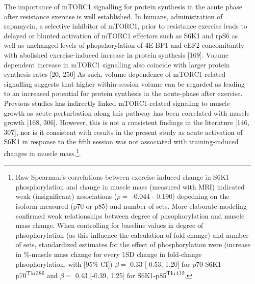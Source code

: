 \documentclass[twoside,10pt]{gihclass} %
\begin{document}
The importance of mTORC1 signalling for protein synthesis in the acute phase after resistance exercise is well established.
In humans, administration of rapamycin, a selective inhibitor of mTORC1, prior to resistance exercise leads to delayed or blunted activation of mTORC1 effectors such as
S6K1 and rpS6 as well as unchanged levels of phopshorylation of 4E-BP1 and eEF2 concomitantly with abolished exercise-induced increase in protein synthesis
{[}169{]}.
Volume dependent increase in mTORC1 signalling also coincide with larger protein synthesis rates
{[}20, 250{]}
As such, volume dependence of mTORC1-related signalling suggests that higher within-session volume can be regarded as leading to an increased potential for protein synthesis in the acute-phase after exercise.
Previous studies has indirectly linked mTORC1-related signaling to muscle growth as acute perturbation along this pathway has been correlated with muscle growth
{[}168, 306{]}.
However, this is not a consistent findings in the literature
{[}146, 307{]},
nor is it consistent with results in the present study as acute activation of S6K1 in response to the fifth session was not associated with training-induced changes in muscle mass.\footnote{Raw Spearman's correlations between exercise induced change in S6K1 phosphorylation and change in muscle mass (measured with MRI) indicated weak (insignificant) associations (\(\rho=\) -0.044 - 0.190) depedning on the isoform measured (p70 or p85) and number of sets. More elaborate modeling confirmed weak relationships between degree of phsophorylation and muscle mass change. When controlling for baseline values in degree of phsophorylation (as this influence the calculation of fold-change) and number of sets, standardized estimates for the effect of phosphorylation were (increase in \%-muscle mass change for every 1SD change in fold-change phsophorylation, with {[}95\% CI{]}) \(\beta=\) 0.33 {[}-0.53, 1.20{]} for p70 S6K1-p70\textsuperscript{Thr389} and \(\beta=\) 0.43 {[}-0.39, 1.25{]} for S6K1-p85\textsuperscript{Thr412}.}.
\end{document}
